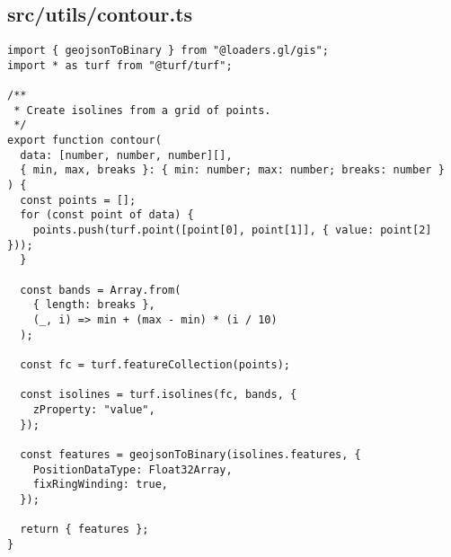 \subsection{src/utils/contour.ts}
\begin{verbatim}
import { geojsonToBinary } from "@loaders.gl/gis";
import * as turf from "@turf/turf";

/**
 * Create isolines from a grid of points.
 */
export function contour(
  data: [number, number, number][],
  { min, max, breaks }: { min: number; max: number; breaks: number }
) {
  const points = [];
  for (const point of data) {
    points.push(turf.point([point[0], point[1]], { value: point[2] }));
  }

  const bands = Array.from(
    { length: breaks },
    (_, i) => min + (max - min) * (i / 10)
  );

  const fc = turf.featureCollection(points);

  const isolines = turf.isolines(fc, bands, {
    zProperty: "value",
  });

  const features = geojsonToBinary(isolines.features, {
    PositionDataType: Float32Array,
    fixRingWinding: true,
  });

  return { features };
}

\end{verbatim}
